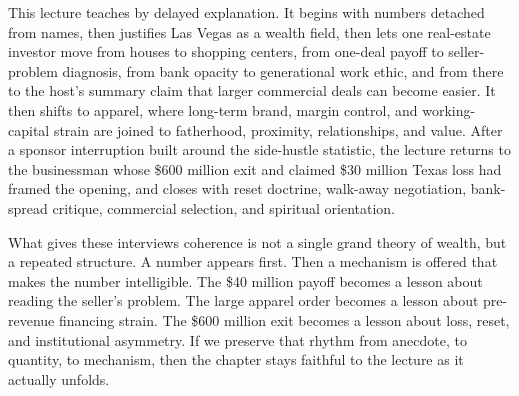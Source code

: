 This lecture teaches by delayed explanation. It begins with numbers detached from names, then justifies Las Vegas as a wealth field, then lets one real-estate investor move from houses to shopping centers, from one-deal payoff to seller-problem diagnosis, from bank opacity to generational work ethic, and from there to the host's summary claim that larger commercial deals can become easier. It then shifts to apparel, where long-term brand, margin control, and working-capital strain are joined to fatherhood, proximity, relationships, and value. After a sponsor interruption built around the side-hustle statistic, the lecture returns to the businessman whose \$600 million exit and claimed \$30 million Texas loss had framed the opening, and closes with reset doctrine, walk-away negotiation, bank-spread critique, commercial selection, and spiritual orientation.

What gives these interviews coherence is not a single grand theory of wealth, but a repeated structure. A number appears first. Then a mechanism is offered that makes the number intelligible. The \$40 million payoff becomes a lesson about reading the seller's problem. The large apparel order becomes a lesson about pre-revenue financing strain. The \$600 million exit becomes a lesson about loss, reset, and institutional asymmetry. If we preserve that rhythm from anecdote, to quantity, to mechanism, then the chapter stays faithful to the lecture as it actually unfolds.